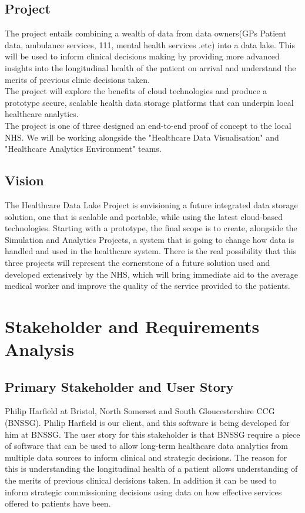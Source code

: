 \documentclass[10pt]{article}
\begin{document}
\subsection{Project}
The project entails combining a wealth of data from data owners(GPs Patient data, ambulance services, 111, mental health services .etc) into a data lake. This will be used to inform clinical decisions making by providing more advanced insights into the longitudinal health of the patient on arrival and understand the merits of previous clinic decisions taken.
\\
The project will explore the benefits of cloud technologies and produce a prototype secure, scalable health data storage platforms that can underpin local healthcare analytics.
\\
The project is one of three designed an end-to-end proof of concept to the local NHS. We will be working alongside the "Healthcare Data Visualisation" and "Healthcare Analytics Environment" teams. 
\subsection{Vision}
The Healthcare Data Lake Project is envisioning a future integrated data storage solution, one that is scalable and portable, while using the latest cloud-based technologies. Starting with a prototype, the final scope is to create, alongside the Simulation and Analytics Projects, a system that is going to change how data is handled and used in the healthcare system. There is the real possibility that this three projects will represent the cornerstone of a future solution used and developed extensively by the NHS, which will bring immediate aid to the average medical worker and improve the quality of the service provided to the patients.

\newpage


\section{Stakeholder and Requirements
Analysis}\label{stakeholder-and-requirements-analysis}

\subsection{Primary Stakeholder and User
Story}\label{primary-stakeholder-and-user-story}

Philip Harfield at Bristol, North Somerset and South Gloucestershire CCG
(BNSSG). Philip Harfield is our client, and this software is being
developed for him at BNSSG. The user story for this stakeholder is that
BNSSG require a piece of software that can be used to allow long-term
healthcare data analytics from multiple data sources to inform clinical
and strategic decisions. The reason for this is understanding the
longitudinal health of a patient allows understanding of the merits of
previous clinical decisions taken. In addition it can be used to inform
strategic commissioning decisions using data on how effective services
offered to patients have been.
\end{document}
